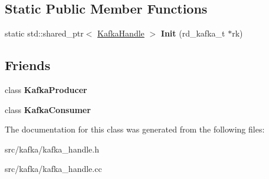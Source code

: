 \subsection*{Static Public Member Functions}
\begin{DoxyCompactItemize}
\item 
static std\+::shared\+\_\+ptr$<$ \hyperlink{classlog2hdfs_1_1KafkaHandle}{Kafka\+Handle} $>$ {\bfseries Init} (rd\+\_\+kafka\+\_\+t $\ast$rk)\hypertarget{classlog2hdfs_1_1KafkaHandle_ad5618fba94f56305c2a4dfe569f59178}{}\label{classlog2hdfs_1_1KafkaHandle_ad5618fba94f56305c2a4dfe569f59178}

\end{DoxyCompactItemize}
\subsection*{Friends}
\begin{DoxyCompactItemize}
\item 
class {\bfseries Kafka\+Producer}\hypertarget{classlog2hdfs_1_1KafkaHandle_a25501737c09078d7d152ac5ba415f843}{}\label{classlog2hdfs_1_1KafkaHandle_a25501737c09078d7d152ac5ba415f843}

\item 
class {\bfseries Kafka\+Consumer}\hypertarget{classlog2hdfs_1_1KafkaHandle_a6333789304ef25919eff3559a1e12c36}{}\label{classlog2hdfs_1_1KafkaHandle_a6333789304ef25919eff3559a1e12c36}

\end{DoxyCompactItemize}


The documentation for this class was generated from the following files\+:\begin{DoxyCompactItemize}
\item 
src/kafka/kafka\+\_\+handle.\+h\item 
src/kafka/kafka\+\_\+handle.\+cc\end{DoxyCompactItemize}
